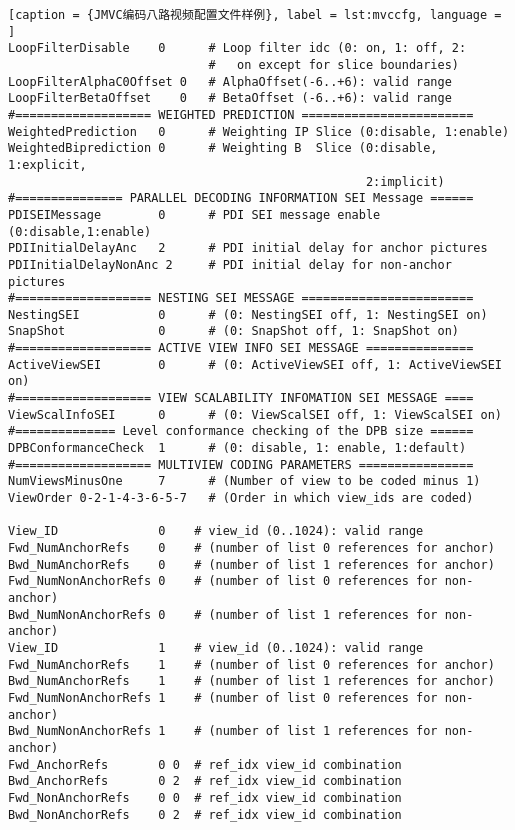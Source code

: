 \begin{lstlisting}[caption = {JMVC编码八路视频配置文件样例}, label = lst:mvccfg, language = ]
LoopFilterDisable    0      # Loop filter idc (0: on, 1: off, 2:
                            #   on except for slice boundaries)
LoopFilterAlphaC0Offset 0   # AlphaOffset(-6..+6): valid range
LoopFilterBetaOffset    0   # BetaOffset (-6..+6): valid range
#=================== WEIGHTED PREDICTION ========================
WeightedPrediction   0      # Weighting IP Slice (0:disable, 1:enable)
WeightedBiprediction 0      # Weighting B  Slice (0:disable, 1:explicit,
                                                  2:implicit)
#=============== PARALLEL DECODING INFORMATION SEI Message ======
PDISEIMessage        0      # PDI SEI message enable (0:disable,1:enable)
PDIInitialDelayAnc   2      # PDI initial delay for anchor pictures
PDIInitialDelayNonAnc 2     # PDI initial delay for non-anchor pictures
#=================== NESTING SEI MESSAGE ========================
NestingSEI           0      # (0: NestingSEI off, 1: NestingSEI on)
SnapShot             0      # (0: SnapShot off, 1: SnapShot on)
#=================== ACTIVE VIEW INFO SEI MESSAGE ===============
ActiveViewSEI        0      # (0: ActiveViewSEI off, 1: ActiveViewSEI on)
#=================== VIEW SCALABILITY INFOMATION SEI MESSAGE ====
ViewScalInfoSEI      0      # (0: ViewScalSEI off, 1: ViewScalSEI on)
#============== Level conformance checking of the DPB size ======
DPBConformanceCheck  1      # (0: disable, 1: enable, 1:default) 
#=================== MULTIVIEW CODING PARAMETERS ================
NumViewsMinusOne     7      # (Number of view to be coded minus 1)
ViewOrder 0-2-1-4-3-6-5-7   # (Order in which view_ids are coded)

View_ID              0    # view_id (0..1024): valid range
Fwd_NumAnchorRefs    0    # (number of list 0 references for anchor)
Bwd_NumAnchorRefs    0    # (number of list 1 references for anchor)
Fwd_NumNonAnchorRefs 0    # (number of list 0 references for non-anchor)
Bwd_NumNonAnchorRefs 0    # (number of list 1 references for non-anchor)
View_ID              1    # view_id (0..1024): valid range
Fwd_NumAnchorRefs    1    # (number of list 0 references for anchor)
Bwd_NumAnchorRefs    1    # (number of list 1 references for anchor)
Fwd_NumNonAnchorRefs 1    # (number of list 0 references for non-anchor) 
Bwd_NumNonAnchorRefs 1    # (number of list 1 references for non-anchor)
Fwd_AnchorRefs       0 0  # ref_idx view_id combination
Bwd_AnchorRefs       0 2  # ref_idx view_id combination
Fwd_NonAnchorRefs    0 0  # ref_idx view_id combination
Bwd_NonAnchorRefs    0 2  # ref_idx view_id combination


\end{lstlisting}
